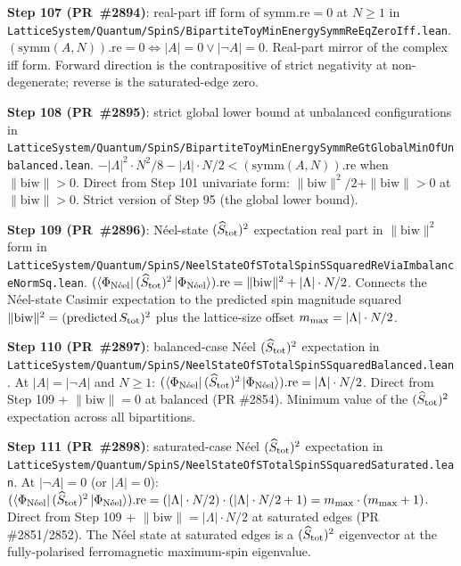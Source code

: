 \documentclass[a4paper,11pt]{article}
\begin{document}
\textbf{Step 107 (PR~\#2894)}: real-part iff form of
$\mathrm{symm.re} = 0$ at $N \ge 1$ in
\texttt{LatticeSystem/Quantum/SpinS/BipartiteToyMinEnergySymmReEqZeroIff.lean}.
$(\mathrm{symm}(A, N)).\mathrm{re} = 0 \iff |A| = 0 \vee |\neg A| = 0$.
Real-part mirror of the complex iff form. Forward direction is the
contrapositive of strict negativity at non-degenerate; reverse is
the saturated-edge zero.

\textbf{Step 108 (PR~\#2895)}: strict global lower bound at
unbalanced configurations in
\texttt{LatticeSystem/Quantum/SpinS/BipartiteToyMinEnergySymmReGtGlobalMinOfUnbalanced.lean}.
$-|\Lambda|^2\cdot N^2/8 - |\Lambda|\cdot N/2 <
   (\mathrm{symm}(A, N)).\mathrm{re}$ when $\|\mathrm{biw}\| > 0$.
Direct from Step 101 univariate form: $\|\mathrm{biw}\|^2/2
+ \|\mathrm{biw}\| > 0$ at $\|\mathrm{biw}\| > 0$. Strict version
of Step 95 (the global lower bound).

\textbf{Step 109 (PR~\#2896)}: Néel-state $(\widehat S_{\rm tot})^2$
expectation real part in $\|\mathrm{biw}\|^2$ form in
\texttt{LatticeSystem/Quantum/SpinS/NeelStateOfSTotalSpinSSquaredReViaImbalanceNormSq.lean}.
$(\langle\Phi_{\rm N\acute{e}el} |\, (\widehat S_{\rm tot})^2\,
   | \Phi_{\rm N\acute{e}el}\rangle).\mathrm{re}
   = \|\mathrm{biw}\|^2 + |\Lambda|\cdot N/2$.
Connects the N\'eel-state Casimir expectation to the predicted
spin magnitude squared $\|\mathrm{biw}\|^2 = (\mathrm{predicted}\,
S_{\rm tot})^2$ plus the lattice-size offset
$m_{\rm max} = |\Lambda|\cdot N/2$.

\textbf{Step 110 (PR~\#2897)}: balanced-case N\'eel
$(\widehat S_{\rm tot})^2$ expectation in
\texttt{LatticeSystem/Quantum/SpinS/NeelStateOfSTotalSpinSSquaredBalanced.lean}.
At $|A| = |\neg A|$ and $N \ge 1$:
$(\langle\Phi_{\rm N\acute{e}el} |\, (\widehat S_{\rm tot})^2\,
   | \Phi_{\rm N\acute{e}el}\rangle).\mathrm{re}
   = |\Lambda|\cdot N/2$.
Direct from Step 109 + $\|\mathrm{biw}\| = 0$ at balanced
(PR \#2854). Minimum value of the $(\widehat S_{\rm tot})^2$
expectation across all bipartitions.

\textbf{Step 111 (PR~\#2898)}: saturated-case N\'eel
$(\widehat S_{\rm tot})^2$ expectation in
\texttt{LatticeSystem/Quantum/SpinS/NeelStateOfSTotalSpinSSquaredSaturated.lean}.
At $|\neg A| = 0$ (or $|A| = 0$):
$(\langle\Phi_{\rm N\acute{e}el} |\, (\widehat S_{\rm tot})^2\,
   | \Phi_{\rm N\acute{e}el}\rangle).\mathrm{re}
   = (|\Lambda|\cdot N/2)\cdot(|\Lambda|\cdot N/2 + 1)
   = m_{\rm max}\cdot(m_{\rm max} + 1)$.
Direct from Step 109 + $\|\mathrm{biw}\| = |\Lambda|\cdot N/2$ at
saturated edges (PR \#2851/2852). The N\'eel state at saturated
edges is a $(\widehat S_{\rm tot})^2$ eigenvector at the
fully-polarised ferromagnetic maximum-spin eigenvalue.
\end{document}
